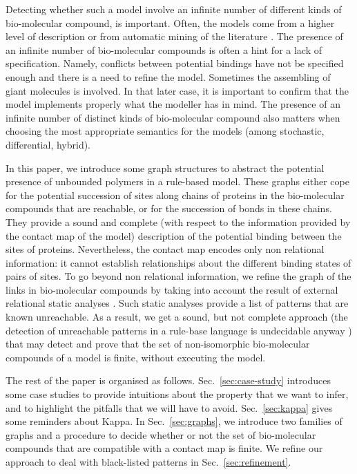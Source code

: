 \documentclass{entcs}
\begin{document}
Detecting whether such a model involve an infinite number of different kinds of bio-molecular compound, is important. Often, the models come from a higher level of description \cite{DBLP:conf/cmsb/HarmerCLO17} or from automatic mining of the literature \cite{Gyori119834}. The presence of an infinite number of bio-molecular compounds is often a hint for a lack of specification. Namely, conflicts between potential bindings have not be specified enough and there is a need to refine the model. Sometimes the assembling of giant molecules is involved. In that later case, it is important to confirm that the model implements properly what the modeller has in mind. The presence of an infinite number of distinct kinds of bio-molecular compound also matters when choosing the most appropriate semantics for the models  (among stochastic, differential, hybrid).

In this paper, we introduce some graph structures to abstract the potential presence of unbounded polymers in a rule-based model. These graphs either cope for the potential succession of sites along chains of proteins in the bio-molecular compounds that are reachable, or for the succession of bonds in these chains. They provide a sound and complete (with respect to the information provided by the contact map of the model) description of the potential binding between the sites of proteins.
Nevertheless, the contact map encodes only non relational information: it cannot establish relationships about the different binding states of pairs of sites. To go beyond non relational information, we refine the graph of the links  in bio-molecular compounds by taking into account the result of external relational static analyses \cite{DanosEtAl-VMCAI08,SASB2016,KaSa}. Such static analyses provide a list of patterns that are known unreachable. As a result, we get a sound, but not complete approach (the detection of unreachable patterns in a rule-base language is undecidable anyway \cite{kreyBig}) that may detect and prove that the set of non-isomorphic bio-molecular compounds of a model is finite, without executing the model.

The rest of the paper is organised as follows.
Sec.~\ref{sec:case-study} introduces some case studies to provide intuitions about the property that we want to infer, and to highlight the pitfalls that we will have to avoid. Sec.~\ref{sec:kappa} gives some reminders about Kappa.
In Sec.~\ref{sec:graphs}, we introduce two families of graphs and a procedure to decide whether or not the set of bio-molecular compounds that are compatible with a contact map is finite. We refine our approach to deal with black-listed patterns in Sec.~\ref{sec:refinement}.
\end{document}
